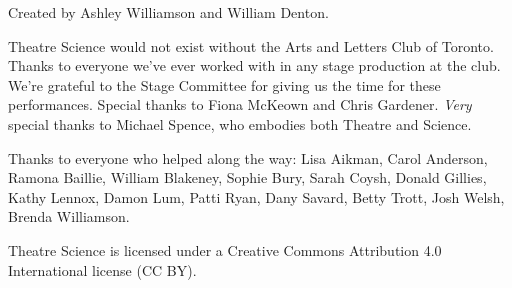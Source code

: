 Created by Ashley Williamson and William Denton.

Theatre Science would not exist without the Arts and Letters Club of Toronto.  Thanks to everyone we've ever worked with in any stage production at the club.  We're grateful to the Stage Committee for giving us the time for these performances.  Special thanks to Fiona McKeown and Chris Gardener.  \textit{Very} special thanks to Michael Spence, who embodies both Theatre and Science.

Thanks to everyone who helped along the way:  Lisa Aikman, Carol Anderson, Ramona Baillie, William Blakeney, Sophie Bury, Sarah Coysh, Donald Gillies, Kathy Lennox, Damon Lum, Patti Ryan, Dany Savard, Betty Trott, Josh Welsh, Brenda Williamson.

Theatre Science is licensed under a Creative Commons Attribution 4.0 International license (CC BY).  %
